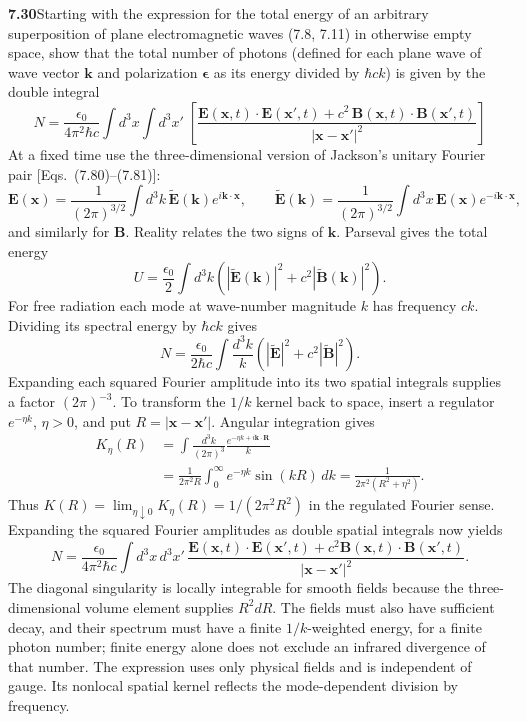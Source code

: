 \par\bigskip
\noindent\textbf{7.30}\quad Starting with the expression for the total energy of an arbitrary superposition of plane electromagnetic waves (7.8, 7.11) in otherwise empty space, show that the total number of photons (defined for each plane wave of wave vector $\mathbf{k}$ and polarization $\boldsymbol{\epsilon}$ as its energy divided by $\hbar ck$) is given by the double integral
\[
N=\frac{\epsilon_{0}}{4\pi^{2}\hbar c}\int\!d^{3}x\int\!d^{3}x'\;\left[\frac{\mathbf{E}(\mathbf{x},t)\cdot\mathbf{E}(\mathbf{x}',t)+c^{2}\,\mathbf{B}(\mathbf{x},t)\cdot\mathbf{B}(\mathbf{x}',t)}{|\mathbf{x}-\mathbf{x}'|^{2}}\right]
\]
\solution
At a fixed time use the three-dimensional version of Jackson's
unitary Fourier pair [Eqs.~(7.80)--(7.81)]:
\[
\mathbf E(\mathbf x)=\frac1{(2\pi)^{3/2}}\int d^3k\,
\widetilde{\mathbf E}(\mathbf k)e^{i\mathbf k\cdot\mathbf x},
\qquad
\widetilde{\mathbf E}(\mathbf k)=\frac1{(2\pi)^{3/2}}\int d^3x\,
\mathbf E(\mathbf x)e^{-i\mathbf k\cdot\mathbf x},
\]
and similarly for $\mathbf B$. Reality relates the two signs of
$\mathbf k$. Parseval gives the total energy
\[
U=\frac{\epsilon_0}{2}\int d^3k
\left(|\widetilde{\mathbf E}(\mathbf k)|^2
+c^2|\widetilde{\mathbf B}(\mathbf k)|^2\right).
\]
For free radiation each mode at wave-number magnitude $k$ has
frequency $ck$. Dividing its spectral energy by $\hbar ck$ gives
\[
N=\frac{\epsilon_0}{2\hbar c}\int\frac{d^3k}{k}
\left(|\widetilde{\mathbf E}|^2+c^2|\widetilde{\mathbf B}|^2\right).
\]
Expanding each squared Fourier amplitude into its two spatial
integrals supplies a factor $(2\pi)^{-3}$.
To transform the $1/k$ kernel back to space, insert a regulator
$e^{-\eta k}$, $\eta>0$, and put $R=|\mathbf x-\mathbf x'|$.
Angular integration gives
\begin{align*}
K_\eta(R)
&=\int\frac{d^3k}{(2\pi)^3}\frac{e^{-\eta k+i\mathbf k\cdot\mathbf R}}k\\
&=\frac1{2\pi^2R}\int_0^\infty e^{-\eta k}\sin(kR)\,dk
=\frac1{2\pi^2(R^2+\eta^2)}.
\end{align*}
Thus $K(R)=\lim_{\eta\downarrow0}K_\eta(R)=1/(2\pi^2R^2)$
in the regulated Fourier sense. Expanding the squared Fourier
amplitudes as double spatial integrals now yields
\[
\boxed{N=\frac{\epsilon_0}{4\pi^2\hbar c}\int d^3x\,d^3x'\,
\frac{\mathbf E(\mathbf x,t)\cdot\mathbf E(\mathbf x',t)
+c^2\mathbf B(\mathbf x,t)\cdot\mathbf B(\mathbf x',t)}
{|\mathbf x-\mathbf x'|^2}.}
\]
The diagonal singularity is locally integrable for smooth fields
because the three-dimensional volume element supplies $R^2dR$.
The fields must also have sufficient decay, and their spectrum must
have a finite $1/k$-weighted energy, for a finite photon number;
finite energy alone does not exclude an infrared divergence of
that number. The expression uses only physical fields and is
independent of gauge. Its nonlocal spatial kernel reflects the
mode-dependent division by frequency.
